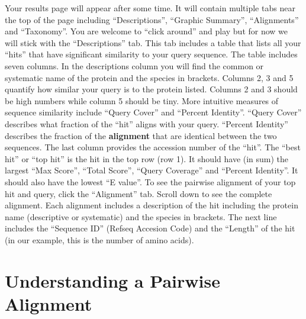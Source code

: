 \documentclass[
]{book}
\begin{document}
Your results page will appear after some time. It will contain multiple tabs near the top of the page including ``Descriptions'', ``Graphic Summary'', ``Alignments'' and ``Taxonomy''. You are welcome to ``click around'' and play but for now we will stick with the ``Descriptions'' tab. This tab includes a table that lists all your ``hits'' that have significant similarity to your query sequence. The table includes seven columns. In the descriptions column you will find the common or systematic name of the protein and the species in brackets. Columns 2, 3 and 5 quantify how similar your query is to the protein listed. Columns 2 and 3 should be high numbers while column 5 should be tiny. More intuitive measures of sequence similarity include ``Query Cover'' and ``Percent Identity''. ``Query Cover'' describes what fraction of the ``hit'' aligns with your query. ``Percent Identity'' describes the fraction of the \textbf{alignment} that are identical between the two sequences. The last column provides the accession number of the ``hit''. The ``best hit'' or ``top hit'' is the hit in the top row (row 1). It should have (in sum) the largest ``Max Score'', ``Total Score'', ``Query Coverage'' and ``Percent Identity''. It should also have the lowest ``E value''. To see the pairwise alignment of your top hit and query, click the ``Alignment'' tab. Scroll down to see the complete alignment. Each alignment includes a description of the hit including the protein name (descriptive or systematic) and the species in brackets. The next line includes the ``Sequence ID'' (Refseq Accesion Code) and the ``Length'' of the hit (in our example, this is the number of amino acids).

\hypertarget{understanding-a-pairwise-alignment}{%
\section{Understanding a Pairwise Alignment}\label{understanding-a-pairwise-alignment}}
\end{document}
